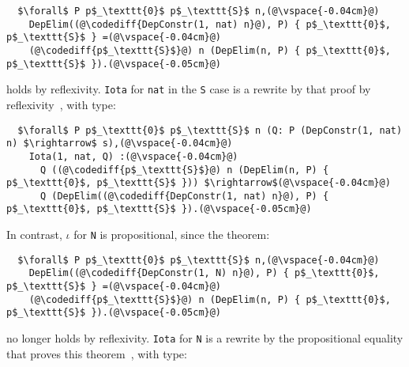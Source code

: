 \begin{lstlisting}
  $\forall$ P p$_\texttt{0}$ p$_\texttt{S}$ n,(@\vspace{-0.04cm}@)
    DepElim((@\codediff{DepConstr(1, nat) n}@), P) { p$_\texttt{0}$, p$_\texttt{S}$ } =(@\vspace{-0.04cm}@)
    (@\codediff{p$_\texttt{S}$}@) n (DepElim(n, P) { p$_\texttt{0}$, p$_\texttt{S}$ }).(@\vspace{-0.05cm}@)
\end{lstlisting}
holds by reflexivity.
\lstinline{Iota} for \lstinline{nat} in the \lstinline{S} case is a rewrite by that proof by reflexivity~\href{https://github.com/uwplse/pumpkin-pi/blob/v2.0.0/plugin/coq/nonorn.v}{},
with type:

\begin{lstlisting}
  $\forall$ P p$_\texttt{0}$ p$_\texttt{S}$ n (Q: P (DepConstr(1, nat) n) $\rightarrow$ s),(@\vspace{-0.04cm}@)
    Iota(1, nat, Q) :(@\vspace{-0.04cm}@)
      Q ((@\codediff{p$_\texttt{S}$}@) n (DepElim(n, P) { p$_\texttt{0}$, p$_\texttt{S}$ })) $\rightarrow$(@\vspace{-0.04cm}@)
      Q (DepElim((@\codediff{DepConstr(1, nat) n}@), P) { p$_\texttt{0}$, p$_\texttt{S}$ }).(@\vspace{-0.05cm}@)
\end{lstlisting}
In contrast, $\iota$ for \lstinline{N} is propositional, since the 
theorem: %

\begin{lstlisting}
  $\forall$ P p$_\texttt{0}$ p$_\texttt{S}$ n,(@\vspace{-0.04cm}@)
    DepElim((@\codediff{DepConstr(1, N) n}@), P) { p$_\texttt{0}$, p$_\texttt{S}$ } =(@\vspace{-0.04cm}@)
    (@\codediff{p$_\texttt{S}$}@) n (DepElim(n, P) { p$_\texttt{0}$, p$_\texttt{S}$ }).(@\vspace{-0.05cm}@)
\end{lstlisting}
no longer holds by reflexivity.
\lstinline{Iota} for \lstinline{N} is a rewrite by the propositional equality that proves this theorem~\href{https://github.com/uwplse/pumpkin-pi/blob/v2.0.0/plugin/coq/nonorn.v}{},
with type:

